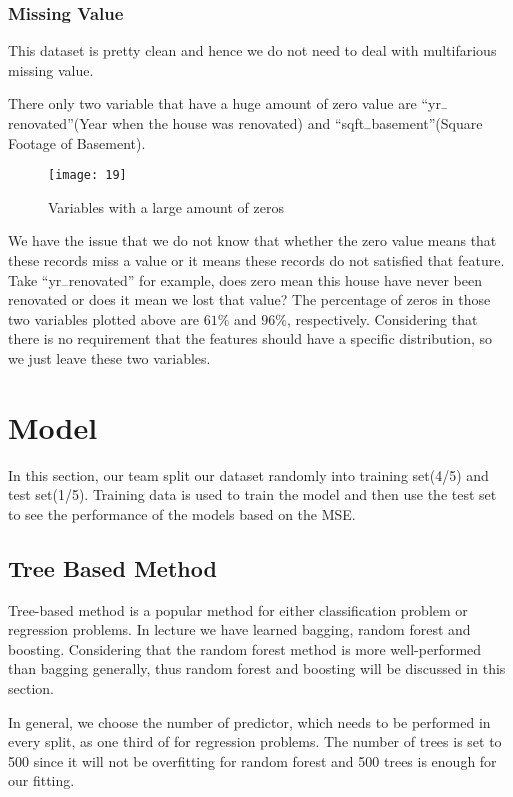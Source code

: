 \documentclass[12pt,twocolumn,twoside]{article}
\begin{document}
\subsubsection{Missing Value}
This dataset is pretty clean and hence we do not need to deal with multifarious missing value.

There only two variable that have a huge amount of zero value are “yr$\rule{0.15cm}{0.1mm}$renovated”(Year when the house was renovated) and “sqft$\rule{0.15cm}{0.1mm}$basement”(Square Footage of Basement).
\begin{figure}[h]
\texttt{[image: 19]}
\caption{Variables with a large amount of zeros}
\end{figure}
We have the issue that we do not know that whether the zero value means that these records miss a value or it means these records do not satisfied that feature. Take “yr$\rule{0.15cm}{0.1mm}$renovated” for example, does zero mean this house have never been renovated or does it mean we lost that value? The percentage of zeros in those two variables plotted above are $61\%$ and $96\%$, respectively. Considering that there is no requirement that the features should have a specific distribution, so we just leave these two variables.

\section{Model}
In this section, our team split our dataset randomly into training set(4/5) and test set(1/5). Training data is used to train the model and then use the test set to see the performance of the models based on the MSE.
\subsection{Tree Based Method}
Tree-based method is a popular method for either classification problem or regression problems. In lecture we have learned bagging, random forest and boosting. Considering that the random forest method is more well-performed than bagging generally, thus random forest and boosting will be discussed in this section.

In general, we choose the number of predictor, which needs to be performed in every split, as one third of for regression problems. The number of trees is set to 500 since it will not be overfitting for random forest and 500 trees is enough for our fitting.
\end{document}
